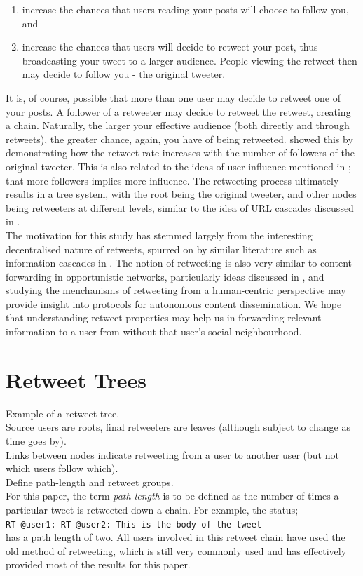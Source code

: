 \begin{enumerate}
\item increase the chances that users reading your posts will choose to follow you, and
\item increase the chances that users will decide to retweet your post, thus broadcasting your tweet to a larger audience. People viewing the retweet then may decide to follow you - the original tweeter. 
\end{enumerate}
It is, of course, possible that more than one user may decide to retweet one of your posts. A follower of a retweeter may decide to retweet the retweet, creating a chain. Naturally, the larger your effective audience (both directly and through retweets), the greater chance, again, you have of being retweeted. \cite{suh10} showed this by demonstrating how the retweet rate increases with the number of followers of the original tweeter. This is also related to the ideas of user influence mentioned in \cite{cha10}; that more followers implies more influence. The retweeting process ultimately results in a tree system, with the root being the original tweeter, and other nodes being retweeters at different levels, similar to the idea of URL cascades discussed in \cite{galuba10}.\\
The motivation for this study has stemmed largely from the interesting decentralised nature of retweets, spurred on by similar literature such as information cascades in \cite{galuba10}. The notion of retweeting is also very similar to content forwarding in opportunistic networks, particularly ideas discussed in \cite{allen10}, and studying the menchanisms of retweeting from a human-centric perspective may provide insight into protocols for autonomous content dissemination. We hope that understanding retweet properties may help us  in forwarding relevant information to a user from without that user's social neighbourhood.

\section{Retweet Trees}
Example of a retweet tree. 
\\
Source users are roots, final retweeters are leaves (although subject to change as time goes by).
\\
Links between nodes indicate retweeting from a user to another user (but not which users follow which).
\\
Define path-length and retweet groups.\\
For this paper, the term \textit{path-length} is to be defined as the number of times a particular tweet is retweeted down a chain. For example, the status;\\ \texttt{RT @user1: RT @user2: This is the body of the tweet} \\has a path length of two. All users involved in this retweet chain have used the old method of retweeting, which is still very commonly used and has effectively provided most of the results for this paper.\\

